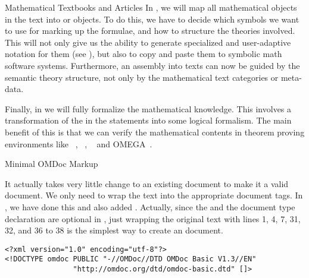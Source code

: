 \begin{tchapter}[id=algebra,short=Textbooks and Articles]{Mathematical Textbooks and Articles}
In {}, we will map all mathematical objects in the text into
{\openmath} or {\cmathml} objects. To do this, we have to decide which
symbols we want to use for marking up the formulae, and how to structure the
theories involved. This will not only give us the ability to generate specialized
and user-adaptive notation for them (see {}), but also to
copy and paste them to symbolic math software systems. Furthermore, an assembly
into texts can now be guided by the semantic theory structure, not only by the
mathematical text categories or meta-data.
   
Finally, in {} we will fully formalize the mathematical
knowledge. This involves a transformation of the
{} in the statements into some logical
formalism. The main benefit of this is that we can verify the mathematical
contents in theorem proving environments like {\nuprl}~\cite{Constable86},
{\hol}~\cite{GoMe93}, {\mizar}~\cite{Rudnicki:aomp92} and
OMEGA~\cite{BenzmuellerEtAl:otama97}.

\begin{tsection}[id=minimal-omdoc]{Minimal OMDoc Markup}

  It actually takes very little change to an existing document to make it a valid {\omdoc}
  document. We only need to wrap the text into the appropriate {\xml} document tags. In
  {}, we have done this and also added
  {}. Actually, since the {} and the document type
  declaration are optional in {\omdoc}, just wrapping the original text with lines 1, 4,
  7, 31, 32, and 36 to 38 is the simplest way to create an {\omdoc}
  document.\medskip
\begin{lstlisting}[label=lst:outerpart,mathescape,
    caption={The outer part of the document},
    index={DOCTYPE,omdoc,metadata,dc:title,dc:creator,dc:date,dc:description,dc:source,
           dc:type,dc:format,theory,omtext,CMP}]
<?xml version="1.0" encoding="utf-8"?>
<!DOCTYPE omdoc PUBLIC "-//OMDoc//DTD OMDoc Basic V1.3//EN"
                "http://omdoc.org/dtd/omdoc-basic.dtd" []>


\end{lstlisting}
\end{tsection}
\end{tchapter}
